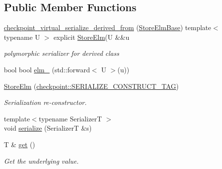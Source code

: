 \subsection*{Public Member Functions}
\begin{DoxyCompactItemize}
\item 
\hyperlink{structvt_1_1vrt_1_1collection_1_1storage_1_1_store_elm_3_01_t_00_01typename_01std_1_1enable__if_947e0655769addb625fb511f777768bd_a594cc389e2453269fd32cce7ff3b48a7}{checkpoint\+\_\+virtual\+\_\+serialize\+\_\+derived\+\_\+from} (\hyperlink{structvt_1_1vrt_1_1collection_1_1storage_1_1_store_elm_base}{Store\+Elm\+Base}) template$<$ typename U $>$ explicit \hyperlink{structvt_1_1vrt_1_1collection_1_1storage_1_1_store_elm}{Store\+Elm}(U \&\&u
\begin{DoxyCompactList}\small\item\em polymorphic serializer for derived class \end{DoxyCompactList}\item 
bool bool \hyperlink{structvt_1_1vrt_1_1collection_1_1storage_1_1_store_elm_3_01_t_00_01typename_01std_1_1enable__if_947e0655769addb625fb511f777768bd_a50ca481760e09bd66574f18794ad8426}{elm\+\_\+} (std\+::forward$<$ U $>$(u))
\item 
\hyperlink{structvt_1_1vrt_1_1collection_1_1storage_1_1_store_elm_3_01_t_00_01typename_01std_1_1enable__if_947e0655769addb625fb511f777768bd_ad8dfd05ce5b4a6937906fce29733ac37}{Store\+Elm} (\hyperlink{namespacecheckpoint_a7ff642cff4d72d01a16ab10e9bc363ef}{checkpoint\+::\+S\+E\+R\+I\+A\+L\+I\+Z\+E\+\_\+\+C\+O\+N\+S\+T\+R\+U\+C\+T\+\_\+\+T\+AG})
\begin{DoxyCompactList}\small\item\em Serialization re-\/constructor. \end{DoxyCompactList}\item 
{\footnotesize template$<$typename SerializerT $>$ }\\void \hyperlink{structvt_1_1vrt_1_1collection_1_1storage_1_1_store_elm_3_01_t_00_01typename_01std_1_1enable__if_947e0655769addb625fb511f777768bd_ae4824f71a4909c65fab811ef7b97f9aa}{serialize} (SerializerT \&s)
\item 
T \& \hyperlink{structvt_1_1vrt_1_1collection_1_1storage_1_1_store_elm_3_01_t_00_01typename_01std_1_1enable__if_947e0655769addb625fb511f777768bd_aca0afee85781dbc7e76c3dff59ab4136}{get} ()
\begin{DoxyCompactList}\small\item\em Get the underlying value. \end{DoxyCompactList}\item 

\end{DoxyCompactItemize}
